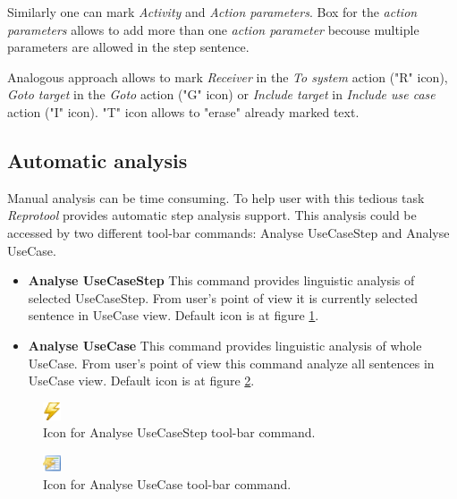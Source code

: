 Similarly one can mark \emph{Activity} and \emph{Action parameters}. Box for the \emph{action parameters} allows to add more than one \emph{action parameter} becouse multiple parameters are
allowed in the step sentence. 

Analogous approach allows to mark \emph{Receiver} in the \emph{To system} action ("R" icon), \emph{Goto target} in the \emph{Goto} action ("G" icon) or \emph{Include target} in \emph{Include use case} action ("I" icon). "T" icon allows to "erase" already marked text.

\subsection{Automatic analysis}

Manual analysis can be time consuming. To help user with this tedious task \emph{Reprotool} provides automatic step analysis support. This analysis could be accessed by two different tool-bar commands: Analyse UseCaseStep and Analyse UseCase.

\begin{itemize}
\item {\bf Analyse UseCaseStep}  This command provides linguistic analysis of selected UseCaseStep. From user's point of view it is currently selected sentence in UseCase view. Default icon is at figure \ref{fig:lighting}.
\item {\bf Analyse UseCase}  This command provides linguistic analysis of whole UseCase. From user's point of view this command analyze all sentences in UseCase view. Default icon is at figure \ref{fig:table-lighting}.
\end{itemize}

\begin{figure}[ht]
  \centering
  \includegraphics[width=15pt]{images/manual-analysis/lightning-16x16}
  \caption{Icon for Analyse UseCaseStep tool-bar command.}
  \label{fig:lighting}
\end{figure}

\begin{figure}[ht]
  \centering
  \includegraphics[width=15pt]{images/manual-analysis/table-lightning-16x16}
  \caption{Icon for Analyse UseCase tool-bar command.}
  \label{fig:table-lighting}
\end{figure}

